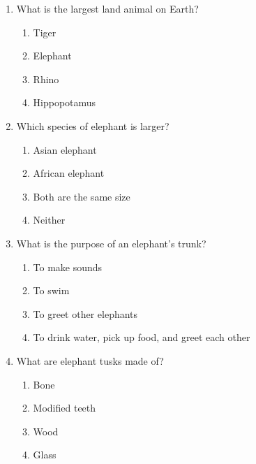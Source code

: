 \documentclass[12pt]{article}
\begin{document}
\begin{enumerate}

    \item What is the largest land animal on Earth?

    \begin{enumerate}[label=\Alph*.]
        \item Tiger
        \item Elephant
        \item Rhino
        \item Hippopotamus
    \end{enumerate}
    
    \vspace{0.5cm}

    \item Which species of elephant is larger?

    \begin{enumerate}[label=\Alph*.]
        \item Asian elephant
        \item African elephant
        \item Both are the same size
        \item Neither
    \end{enumerate}
    
    \vspace{0.5cm}

    \item What is the purpose of an elephant’s trunk?

    \begin{enumerate}[label=\Alph*.]
        \item To make sounds
        \item To swim
        \item To greet other elephants
        \item To drink water, pick up food, and greet each other
    \end{enumerate}
    
    \vspace{0.5cm}

    \item What are elephant tusks made of?

    \begin{enumerate}[label=\Alph*.]
        \item Bone
        \item Modified teeth
        \item Wood
        \item Glass
    \end{enumerate}
    

\end{enumerate}
\end{document}
